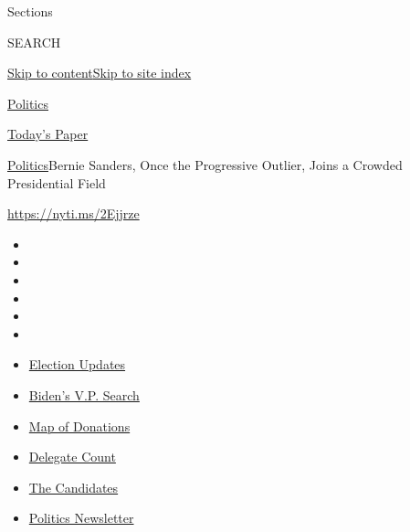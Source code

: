 Sections

SEARCH

\protect\hyperlink{site-content}{Skip to
content}\protect\hyperlink{site-index}{Skip to site index}

\href{https://www.nytimes.com/section/politics}{Politics}

\href{https://myaccount.nytimes.com/auth/login?response_type=cookie\&client_id=vi}{}

\href{https://www.nytimes.com/section/todayspaper}{Today's Paper}

\href{/section/politics}{Politics}\textbar{}Bernie Sanders, Once the
Progressive Outlier, Joins a Crowded Presidential Field

\url{https://nyti.ms/2Ejjrze}

\begin{itemize}
\item
\item
\item
\item
\item
\item
\end{itemize}

\begin{itemize}
\item
  \href{https://www.nytimes.com/2020/07/31/us/elections/biden-vs-trump.html?action=click\&pgtype=Article\&state=default\&region=TOP_BANNER\&context=storylines_menu}{Election
  Updates}
\item
  \href{https://www.nytimes.com/article/biden-vice-president-2020.html?action=click\&pgtype=Article\&state=default\&region=TOP_BANNER\&context=storylines_menu}{Biden's
  V.P. Search}
\item
  \href{https://www.nytimes.com/interactive/2020/07/24/us/politics/trump-biden-campaign-donors.html?action=click\&pgtype=Article\&state=default\&region=TOP_BANNER\&context=storylines_menu}{Map
  of Donations}
\item
  \href{https://www.nytimes.com/interactive/2020/us/elections/delegate-count-primary-results.html?action=click\&pgtype=Article\&state=default\&region=TOP_BANNER\&context=storylines_menu}{Delegate
  Count}
\item
  \href{https://www.nytimes.com/interactive/2019/us/politics/2020-presidential-candidates.html?action=click\&pgtype=Article\&state=default\&region=TOP_BANNER\&context=storylines_menu}{The
  Candidates}
\item
  \href{https://www.nytimes.com/newsletters/politics?action=click\&pgtype=Article\&state=default\&region=TOP_BANNER\&context=storylines_menu}{Politics
  Newsletter}
\end{itemize}

